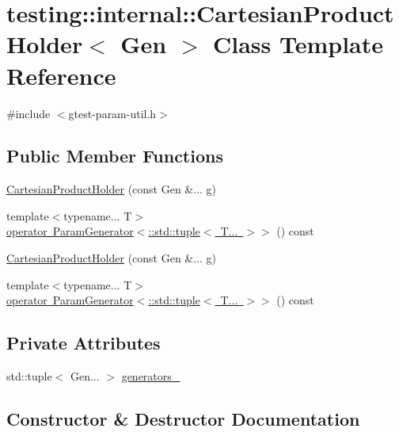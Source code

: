 \hypertarget{classtesting_1_1internal_1_1_cartesian_product_holder}{}\section{testing\+::internal\+::Cartesian\+Product\+Holder$<$ Gen $>$ Class Template Reference}
\label{classtesting_1_1internal_1_1_cartesian_product_holder}


{\ttfamily \#include $<$gtest-\/param-\/util.\+h$>$}

\subsection*{Public Member Functions}
\begin{DoxyCompactItemize}
\item 
\mbox{\hyperlink{classtesting_1_1internal_1_1_cartesian_product_holder_a3584d073ddbe024d6bc478a988c4111c}{Cartesian\+Product\+Holder}} (const Gen \&... g)
\item 
{\footnotesize template$<$typename... T$>$ }\\\mbox{\hyperlink{classtesting_1_1internal_1_1_cartesian_product_holder_ab29313123e08f3fc7111eac6e80351a5}{operator Param\+Generator$<$\+::std\+::tuple$<$ T... $>$$>$}} () const
\item 
\mbox{\hyperlink{classtesting_1_1internal_1_1_cartesian_product_holder_a3584d073ddbe024d6bc478a988c4111c}{Cartesian\+Product\+Holder}} (const Gen \&... g)
\item 
{\footnotesize template$<$typename... T$>$ }\\\mbox{\hyperlink{classtesting_1_1internal_1_1_cartesian_product_holder_ab29313123e08f3fc7111eac6e80351a5}{operator Param\+Generator$<$\+::std\+::tuple$<$ T... $>$$>$}} () const
\end{DoxyCompactItemize}
\subsection*{Private Attributes}
\begin{DoxyCompactItemize}
\item 
std\+::tuple$<$ Gen... $>$ \mbox{\hyperlink{classtesting_1_1internal_1_1_cartesian_product_holder_ad61e0fa4c35c6eae11481cd5728cba68}{generators\+\_\+}}
\end{DoxyCompactItemize}


\subsection{Constructor \& Destructor Documentation}
\mbox{\label{classtesting_1_1internal_1_1_cartesian_product_holder_a3584d073ddbe024d6bc478a988c4111c}} 

